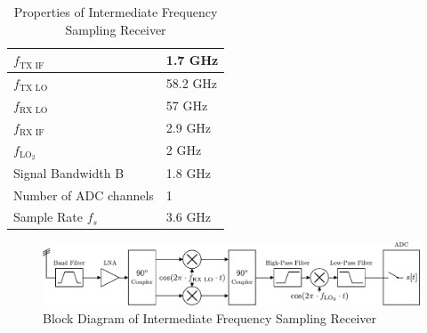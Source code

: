 \begin{table}[h]
  \centering
  \begin{tabular}{|l|l|}
    \hline
    $f_{\text{TX IF}}$ & 1.7 GHz \\ \hline
    $f_{\text{TX LO}}$ & 58.2 GHz \\ \hline
    $f_{\text{RX LO}}$ & 57 GHz \\ \hline
    $f_{\text{RX IF}}$ & 2.9 GHz \\ \hline
    $f_{\text{LO}_2} $ & 2 GHz \\ \hline
    Signal Bandwidth B & 1.8 GHz \\ \hline
    Number of \gls{ADC} channels & 1 \\ \hline
    Sample Rate $f_s$ & 3.6 GHz \\ \hline
  \end{tabular}
  \caption{Properties of Intermediate Frequency Sampling Receiver}
  \label{tab:rx_1}
\end{table}

\begin{figure}[h!]
  \centering
  \includegraphics[width=\textwidth]{figures/rx_1_bd}
  \caption{Block Diagram of Intermediate Frequency Sampling Receiver}
  \label{fig:rx_1_bd}
\end{figure}

